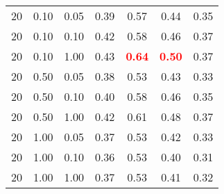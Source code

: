 \begin{tabular}{lllcccc}
20 & 0.10 & 0.05 & 0.39 & 0.57 & 0.44 & 0.35 \\ 
20 & 0.10 & 0.10 & 0.42 & 0.58 & 0.46 & 0.37 \\ 
20 & 0.10 & 1.00 & 0.43 & \textbf{\textcolor{red}{0.64}} & \textbf{\textcolor{red}{0.50}} & 0.37 \\ 
20 & 0.50 & 0.05 & 0.38 & 0.53 & 0.43 & 0.33 \\ 
20 & 0.50 & 0.10 & 0.40 & 0.58 & 0.46 & 0.35 \\ 
20 & 0.50 & 1.00 & 0.42 & 0.61 & 0.48 & 0.37 \\ 
20 & 1.00 & 0.05 & 0.37 & 0.53 & 0.42 & 0.33 \\ 
20 & 1.00 & 0.10 & 0.36 & 0.53 & 0.40 & 0.31 \\ 
20 & 1.00 & 1.00 & 0.37 & 0.53 & 0.41 & 0.32 \\ 
\end{tabular} 
